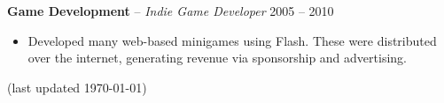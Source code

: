 \documentclass{article}
\begin{document}
\textbf{Game Development} -- \emph{Indie Game Developer} \hfill 2005 -- 2010 \\[-6mm]
\begin{itemize}
  \item[]
  Developed many web-based minigames using Flash. These were distributed over the
  internet, generating revenue via sponsorship and advertising.
\end{itemize} \bigskip



\centering \small (last updated \today)
\end{document}
